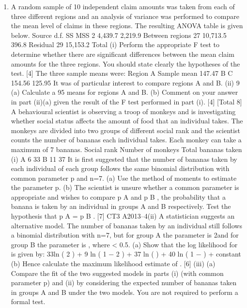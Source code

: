 \documentclass[a4paper,12pt]{article}
\begin{document}
\begin{enumerate}

\item A random sample of 10 independent claim amounts was taken from each of three
different regions and an analysis of variance was performed to compare the mean
level of claims in these regions. The resulting ANOVA table is given below.
Source
d.f.
SS
MSS
2
4,439.7
2,219.9
Between regions
27 10,713.5 396.8
Residual
29 15,153.2
Total
(i)
Perform the appropriate F test to determine whether there are significant
differences between the mean claim amounts for the three regions. You
should state clearly the hypotheses of the test.
[4]
The three sample means were:
Region
A
Sample mean 147.47
B
C
154.56 125.95
It was of particular interest to compare regions A and B.
(ii)
9
(a) Calculate a 95%
means for regions A and B.
(b) Comment on your answer in part (ii)(a) given the result of the F test
performed in part (i).
[4]
[Total 8]
A behavioural scientist is observing a troop of monkeys and is investigating whether
social status affects the amount of food that an individual takes. The monkeys are
divided into two groups of different social rank and the scientist counts the number of
bananas each individual takes. Each monkey can take a maximum of 7 bananas.
Social rank
Number of monkeys
Total bananas taken
(i)
A
6
33
B
11
37
It is first suggested that the number of bananas taken by each individual of
each group follows the same binomial distribution with common parameter p
and n=7.
(a) Use the method of moments to estimate the parameter p.
(b) The scientist is unsure whether a common parameter is appropriate and
wishes to compare p A and p B , the probability that a banana is taken
by an individual in groups A and B respectively.
Test the hypothesis that p A = p B .
[7]
CT3 A2013–4(ii)
A statistician suggests an alternative model. The number of bananas taken by
an individual still follows a binomial distribution with n=7, but for group A
the parameter is 2\theta and for group B the parameter is \theta, where \theta < 0.5.
(a)
Show that the log likelihood for \theta is given by:
33ln ( 2 \theta ) + 9 ln ( 1 − 2 \theta ) + 37 ln ( \theta ) + 40 ln ( 1 − \theta ) + constant
(b)
Hence calculate the maximum likelihood estimate of \theta.
[6]
(iii)
(a) Compare the fit of the two suggested models in parts (i) (with common
parameter p) and (ii) by considering the expected number of bananas
taken in groups A and B under the two models. You are not required
to perform a formal test.

\end{enumerate}
\end{document}
